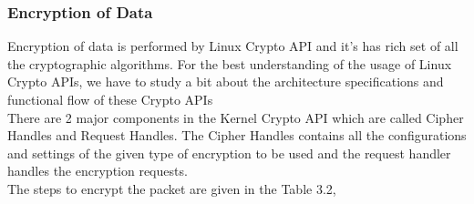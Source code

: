 \subsubsection{Encryption of Data}  

Encryption of data is performed by Linux Crypto API and it’s has rich set of all the cryptographic algorithms. For the best understanding of the usage of Linux Crypto APIs, we have to study a bit about the architecture specifications and functional flow of these Crypto APIs \\

There are 2 major components in the Kernel Crypto API which are called Cipher Handles and Request Handles. The Cipher Handles contains all the configurations and settings of the given type of encryption to be used and the request handler handles the encryption requests. \\

The steps to encrypt the packet are given in the Table 3.2,\\


